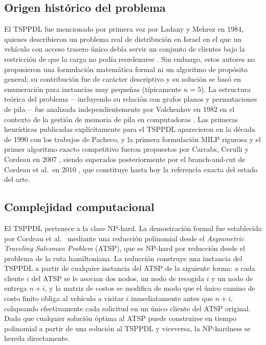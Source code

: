 \documentclass[conference]{IEEEtran}
\begin{document}
\subsection{Origen histórico del problema}
El TSPPDL fue mencionado por primera vez por Ladany y Mehrez en 1984, quienes describieron un problema real de distribución en Israel en el que un vehículo con acceso trasero único debía servir un conjunto de clientes bajo la restricción de que la carga no podía reordenarse \cite{cordeau2010}. Sin embargo, estos autores no propusieron una formulación matemática formal ni un algoritmo de propósito general; su contribución fue de carácter descriptivo y su solución se basó en enumeración para instancias muy pequeñas (típicamente $n=5$). La estructura teórica del problema —incluyendo su relación con grafos planos y permutaciones de pila— fue analizada independientemente por Volchenkov en 1982 en el contexto de la gestión de memoria de pila en computadoras \cite{cordeau2010}. Las primeras heurísticas publicadas explícitamente para el TSPPDL aparecieron en la década de 1990 con los trabajos de Pacheco, y la primera formulación MILP rigurosa y el primer algoritmo exacto competitivo fueron propuestos por Carrabs, Cerulli y Cordeau en 2007 \cite{carrabs2007bb}, siendo superados posteriormente por el branch-and-cut de Cordeau et al.\ en 2010 \cite{cordeau2010}, que constituye hasta hoy la referencia exacta del estado del arte.

\subsection{Complejidad computacional}
El TSPPDL pertenece a la clase NP-hard. La demostración formal fue establecida por Cordeau et al.\ \cite{cordeau2010} mediante una reducción polinomial desde el \textit{Asymmetric Traveling Salesman Problem} (ATSP), que es NP-hard por reducción desde el problema de la ruta hamiltoniana. La reducción construye una instancia del TSPPDL a partir de cualquier instancia del ATSP de la siguiente forma: a cada cliente $i$ del ATSP se le asocian dos nodos, un nodo de recogida $i$ y un nodo de entrega $n+i$, y la matriz de costos se modifica de modo que el único camino de costo finito obliga al vehículo a visitar $i$ inmediatamente antes que $n+i$, colapsando efectivamente cada solicitud en un único cliente del ATSP original. Dado que cualquier solución óptima al ATSP puede construirse en tiempo polinomial a partir de una solución al TSPPDL y viceversa, la NP-hardness se hereda directamente.
\end{document}
